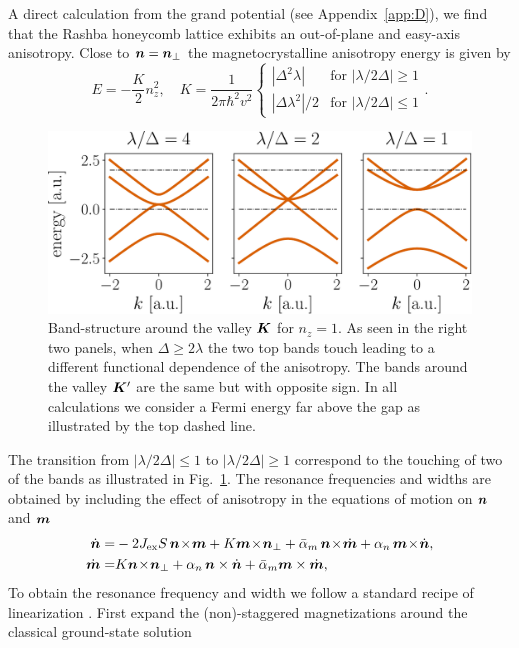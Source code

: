 A direct calculation from the grand potential (see Appendix~\ref{app:D}), we find that the Rashba honeycomb lattice exhibits an out-of-plane and easy-axis anisotropy. Close to $\boldsymbol{n}=\boldsymbol{n}_\perp$ the magnetocrystalline anisotropy energy is given by
\begin{equation}
    E = -\frac{K}{2}n_z^2, \quad K= \frac{1}{2\pi\hbar^2v^2}\begin{cases}
    |\Delta^2\lambda|  &  \text{for } |\lambda/2\Delta| \geq 1 \\
    |\Delta\lambda^2|/2  &  \text{for } |\lambda/2\Delta| \leq 1
    \end{cases}.
\end{equation}
\begin{figure}
    \centering
    \includegraphics[width=0.75\linewidth]{gfx/fig2_new.pdf}
    \caption{Band-structure around the valley $\boldsymbol{K}$ for $n_z=1$. As seen in the right two panels, when $\Delta\geq2\lambda$ the two top bands touch leading to a different functional dependence of the anisotropy. The bands around the valley $\boldsymbol{K}'$ are the same but with opposite sign. In all calculations we consider a Fermi energy far above the gap as illustrated by the top dashed line.  }
    \label{fig:bands}
\end{figure}
The transition from $|\lambda/2\Delta|\le1$ to $|\lambda/2\Delta|\ge1$ correspond to the touching of two of the bands as illustrated in Fig.~\ref{fig:bands}. The resonance frequencies and widths are obtained by including the effect of anisotropy in the equations of motion on $\boldsymbol{n}$ and $\boldsymbol{m}$
\beml
\label{AFMEOM2}
\begin{align}
\label{ndot2}
\dot{\bb{n}} = &  -2J_\text{ex}S\, \bb{n}\!\times\!\bb{m} +K \bb{m}\!\times\!\bb{n}_\perp+\bar{\alpha}_m\,\bb{n}\!\times\!\dot{\bb{m}}+\alpha_n\,\bb{m}\!\times\! \dot{\bb{n}},\\
\label{mdot2}
\dot{\bb{m}} = & K  \bb{n}\!\times\!\bb{n}_\perp+\alpha_n\,\bb{n} \times \dot{\bb{n}}+\bar{\alpha}_m \bb{m} \times \dot{\bb{m}} ,
\end{align}
\eml
To obtain the resonance frequency and width we follow a standard recipe of linearization \cite{keffer_theory_1952}. First expand the (non)-staggered magnetizations around the classical ground-state solution
